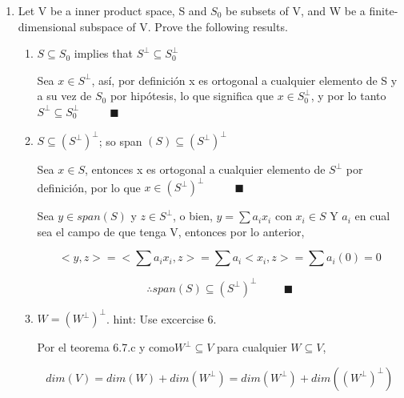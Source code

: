 \documentclass[12pt,a4paper]{article}
\begin{document}
\begin{enumerate}
\begin{enumerate}
    \end{enumerate}
    
    
    
    
    \item Let V be a inner product space, S and $S_0$ be subsets of V, and W be a finite-dimensional subspace of V. Prove the following results.
    
    \begin{enumerate}
        \item $S \subseteq S_0 $ implies that $S^\perp \subseteq S_0^\perp$
        
        Sea $x \in S^\perp$, así, por definición x es ortogonal a cualquier elemento de S y a su vez de $S_0$ por hipótesis, lo que significa que $x \in S_0 ^\perp$, y por lo tanto $S^\perp \subseteq S_0^\perp$ $\hspace{1cm} \blacksquare$
        
        \item $S \subseteq (S^\perp)^\perp$; so span $(S) \subseteq (S^\perp)^\perp$
        
        Sea $x \in S$, entonces x es ortogonal a cualquier elemento de $S^\perp$ por definición, por lo que $x \in (S^\perp)^\perp$ $\hspace{1cm} \blacksquare$
        
        Sea $y \in span(S)$ y $z \in S^\perp$, o bien, $y = \sum a_i x_i$ con $x_i \in S$ Y $a_i$ en cual sea el campo de que tenga V, entonces por lo anterior, 
        
        \begin{equation*}
            <y,z> = <\sum a_i x_i,z> = \sum a_i<x_i,z> = \sum a_i (0) = 0
        \end{equation*}
        
        \begin{equation*}
            \therefore span (S) \subseteq (S^\perp)^\perp \hspace{1cm} \blacksquare
        \end{equation*}
        
        \item $W =(W^\perp)^\perp$. hint: Use excercise 6.
        
        Por el teorema 6.7.c y como$W^\perp \subseteq V $ para cualquier $W \subseteq V$,
        
        \begin{equation*}
            dim(V) = dim(W) + dim(W^\perp) = dim(W^\perp) + dim((W^\perp)^\perp)
        \end{equation*}
        

\end{enumerate}
\end{enumerate}
\end{document}

